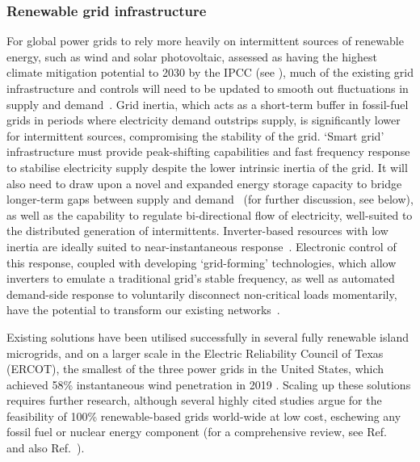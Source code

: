 \documentclass[../SustainableHEP.tex]{subfiles}
\begin{document}

\subsubsection{Renewable grid infrastructure}
\label{subsec:grid}
For global power grids to rely more heavily on intermittent sources of renewable energy, such as wind and solar photovoltaic, assessed as having the highest climate mitigation potential to 2030 by the IPCC (see ), much of the existing grid infrastructure and controls will need to be updated to smooth out fluctuations in supply and demand~\cite{PowerGridInertia}.  Grid inertia, which acts as a short-term buffer in fossil-fuel grids in periods where electricity demand outstrips supply, is significantly lower for intermittent sources, compromising the stability of the grid. `Smart grid' infrastructure must provide peak-shifting capabilities and fast frequency response to stabilise electricity supply despite the lower intrinsic inertia of the grid.  It will also need to draw upon a novel and expanded energy storage capacity to bridge longer-term gaps between supply and demand~\cite{LDESEnergyStorage} (for further discussion, see below), as well as the capability to regulate bi-directional flow of electricity, well-suited to the distributed generation of intermittents.  Inverter-based resources with low inertia are ideally suited to near-instantaneous response~\cite{PowerGridInertia}.  Electronic control of this response, coupled with developing `grid-forming' technologies, which allow inverters to emulate a traditional grid's stable frequency, as well as automated demand-side response to voluntarily disconnect non-critical loads momentarily, have the potential to transform our existing networks~\cite{PowerGridInertia}.  

Existing solutions have been utilised successfully in several fully renewable island microgrids, and on a larger scale in the Electric Reliability Council of Texas (ERCOT), the smallest of the three power grids in the United States, which achieved 58\% instantaneous wind penetration in 2019 \cite{PowerGridInertia}.  Scaling up these solutions requires further research, although several highly cited studies argue for the feasibility of 100\% renewable-based grids world-wide at low cost, eschewing any fossil fuel or nuclear energy component (for a comprehensive review, see Ref.~\cite{HEARD20171122} and also Ref.~\cite{BROWN2018834}).  
\end{document}
